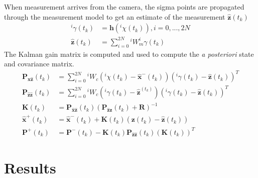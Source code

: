 \documentclass[letterpaper]{article}
\newcommand{\bb}[1]{\mathbf{#1}}
\begin{document}
When measurement arrives from the camera, the sigma points are
propagated through the measurement model to get an estimate of the
measurement $\bb{\hat{z}}(t_k)$
\begin{align}
^i \gamma(t_k) &= \bb{h}(^i \chi(t_k)), i=0,...,2N \\
\bb{\hat{z}}(t_k) &=\sum_{i=0}^{2N} \text{} ^iW_m ^i\gamma(t_k) \nonumber
\end{align}
The Kalman gain matrix is computed and used to compute the \emph{a
  posteriori} state and covariance matrix.
\begin{align}
\bb{P}_{\bb{\hat{x}\hat{z}}}(t_k)&=\sum_{i=0}^{2N} \text{} ^iW_c\left( ^i \chi(t_k) - \bb{\hat{x}}^-(t_k) \right) \left( ^i \gamma(t_k)- \bb{\hat{z}}(t_k) \right)^T \\
\bb{P}_{\bb{\hat{z}\hat{z}}}(t_k)&=\sum_{i=0}^{2N} \text{} ^iW_c\left( ^i \gamma(t_k) - \bb{\hat{z}}^(t_k) \right) \left( ^i \gamma(t_k)- \bb{\hat{z}}(t_k) \right)^T \nonumber \\
\bb{K}(t_k)&=\bb{P}_{\bb{\hat{x}\hat{z}}}(t_k) \left( \bb{P}_{\bb{\hat{z}\hat{z}}}(t_k) + \bb{R} \right)^{-1} \nonumber \\
\bb{\hat{x}}^+(t_k)&=\bb{\hat{x}}^-(t_k)+\bb{K}(t_k)\left( \bb{z}(t_k)-\bb{\hat{z}}(t_k) \right) \nonumber \\
\bb{P}^+(t_k)&=\bb{P}^-(t_k)-\bb{K}(t_k)\bb{P}_{\bb{\hat{z}\hat{z}}}(t_k)(\bb{K}(t_k))^T \nonumber
\end{align}



\section{Results}



\end{document}

